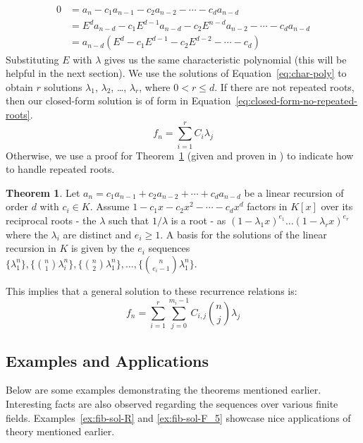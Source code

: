 \documentclass[a4paper]{article}
\theoremstyle{definition}
\newtheorem{theorem}{Theorem}[section]
\begin{document}
\begin{align*}
0
&= a_n-c_1a_{n-1}-c_2a_{n-2}-\cdots-c_{d}a_{n-d} \\
&= E^{d}a_{n-d}-c_1E^{d-1}a_{n-d}-c_2E^{n-d}a_{n-2}-\cdots-c_{d}a_{n-d} \\
&= a_{n-d}(E^d-c_1E^{d-1}-c_2E^{d-2}-\cdots-c_d)
\end{align*}
Substituting $E$ with $\lambda$ gives us the same characteristic polynomial (this will be helpful in the next
section). We use the solutions of Equation~\ref{eq:char-poly} to obtain $r$ solutions $\lambda_1$,
$\lambda_2$, \ldots, $\lambda_r$, where $0<r\le d$. If there are not repeated roots, then our closed-form
solution is of form in Equation~\ref{eq:closed-form-no-repeated-roots}.
\begin{equation}
f_n=\sum_{i=1}^r C_{i}\lambda_j
\label{eq:closed-form-no-repeated-roots}
\end{equation}
Otherwise, we use a proof for Theorem~\ref{thm:repeated-roots} (given and proven in
\cite{bib:solve-lin-rec-field}) to indicate how to handle repeated roots. 
\\
\begin{theorem}
Let $a_n = c_1a_{n-1} + c_2a_{n-2} + \cdots + c_{d}a_{n-d}$ be a linear recursion of order $d$ with
$c_i \in K$. Assume $1 - c_1x - c_2x^2 - \cdots - c_{d}x^d$ factors in $K[x]$ over its reciprocal roots - the
$\lambda$ such that $1/\lambda$ is a root - as $(1-\lambda_{1}x)^{e_1} \ldots (1-\lambda_{r}x)^{e_r}$ where
the $\lambda_i$ are distinct and $e_i \ge 1$. A basis for the solutions of the linear recursion in $K$ is
given by the $e_i$ sequences
$\{\lambda_1^n\}, \{\binom{n}{1}\lambda_i^n\}, \{\binom{n}{2}\lambda_1^n\}, \ldots, \{\binom{n}{e_i-1}\lambda_1^n\}$.
\label{thm:repeated-roots}
\end{theorem}
This implies that a general solution to these recurrence relations is:
\begin{equation}
f_n=\sum_{i=1}^r\sum_{j=0}^{m_i-1} C_{i,j}\binom{n}{j}\lambda_j
\label{eq:closed-form-repeated-roots}
\end{equation}

\subsection{Examples and Applications}

Below are some examples demonstrating the theorems mentioned earlier. Interesting facts are also
observed regarding the sequences over various finite fields. Examples~\ref{ex:fib-sol-R} and
\ref{ex:fib-sol-F_5} showcase nice applications of theory mentioned earlier.
\\
\end{document}
